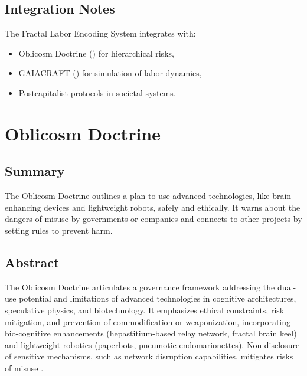 \documentclass[11pt,oneside]{memoir}
\theoremstyle{plain}
\begin{document}
\section{Integration Notes}
The Fractal Labor Encoding System integrates with:
\begin{itemize}
    \item Oblicosm Doctrine () for hierarchical risks,
    \item GAIACRAFT () for simulation of labor dynamics,
    \item Postcapitalist protocols in societal systems.
\end{itemize}

\chapter{Oblicosm Doctrine}
\label{sec:oblicosm_doctrine}

\section{Summary}
The Oblicosm Doctrine outlines a plan to use advanced technologies, like brain-enhancing devices and lightweight robots, safely and ethically. It warns about the dangers of misuse by governments or companies and connects to other projects by setting rules to prevent harm.

\section{Abstract}
The Oblicosm Doctrine articulates a governance framework addressing the dual-use potential and limitations of advanced technologies in cognitive architectures, speculative physics, and biotechnology. It emphasizes ethical constraints, risk mitigation, and prevention of commodification or weaponization, incorporating bio-cognitive enhancements (hepastitium-based relay network, fractal brain keel) and lightweight robotics (paperbots, pneumotic endomarionettes). Non-disclosure of sensitive mechanisms, such as network disruption capabilities, mitigates risks of misuse \cite{ai_ethics, ai_ethics_framework}.
\end{document}
